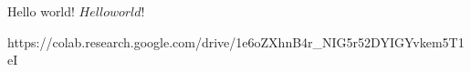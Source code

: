 \documentclass[12pt]{article}
\begin{document}
Hello world!
$Hello world!$ %

https://colab.research.google.com/drive/1e6oZXhnB4r_NIG5r52DYIGYvkem5T1eI
\end{document}
